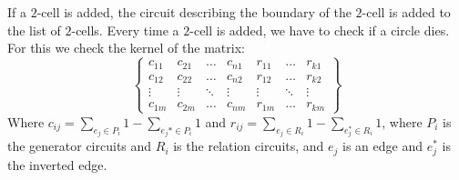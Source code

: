 \documentclass[11pt, a4paper, UKenglish]{article}
\begin{document}
    If a $2$-cell is added, the circuit describing the boundary of the $2$-cell is added to the list of $2$-cells.
    Every time a $2$-cell is added, we have to check if a circle dies.
    For this we check the kernel of the matrix:
    \[\begin{Bmatrix}
          c_{11} & c_{21} & \ldots &c_{n1} & r_{11} & \ldots  & r_{k1}\\
          c_{12} & c_{22} & \ldots &c_{n2} & r_{12} & \ldots  & r_{k2}\\
          \vdots & \vdots & \ddots & \vdots & \vdots & \ddots & \vdots \\
          c_{1m} & c_{2m} & \ldots &c_{nm} & r_{1m} & \ldots  & r_{km}
    \end{Bmatrix}\]
    Where $c_{ij} = \sum_{e_j\in P_i} 1 - \sum_{e_j*\in P_i}1$ and $r_{ij} = \sum_{e_j\in R_i} 1 - \sum_{e_j^*\in R_i}1$, where $P_i$ is the generator circuits and $R_i$ is the relation circuits, and $e_j$ is an edge and $e_j^*$ is the inverted edge.
\end{document}
